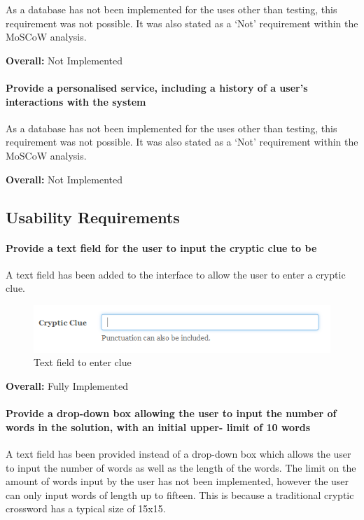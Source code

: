 As a database has not been implemented for the uses other than testing,  this
requirement was not possible. It was also stated as a `Not' requirement  within
the MoSCoW analysis.

{\bf Overall:} Not Implemented


\paragraph{Provide a personalised service, including a history of a user's
interactions with the system}

As a database has not been implemented for the uses other than testing,  this
requirement was not possible. It was also stated as a `Not' requirement  within
the MoSCoW analysis.

{\bf Overall:} Not Implemented


\subsection{Usability Requirements}
\label{sub:test_func_usability}


\paragraph{Provide a text field for the user to input the cryptic clue to be}

A text field has been added to the interface to allow the user to enter a 
cryptic clue. 

\begin{figure}[H]
	\centering
	 \includegraphics[keepaspectratio=true]{evidence/enterclue.png}
	\caption{Text field to enter clue}
\end{figure}

{\bf Overall:} Fully Implemented


\paragraph{Provide a drop-down box allowing the user to input the number of
words in the solution, with an initial upper- limit of 10 words}

A text field has been provided instead of a drop-down box which allows the user
to input the number of words as well as the length of the words. The limit on
the amount of words input by the user has not been implemented, however the
user  can only input words of length up to fifteen. This is because a
traditional cryptic  crossword has a typical size of 15x15.

